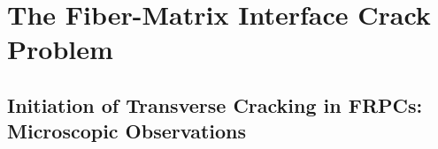 \documentclass[first,firstsupp,lastsupp,last,hyperref,table]{ETHclass}
\begin{document}

\section[The Fiber-Matrix Interface Crack Problem]{The Fiber-Matrix Interface Crack Problem}

\subsection[Initiation of Transverse Cracking in FRPCs]{Initiation of Transverse Cracking in FRPCs: Microscopic Observations}
\end{document}
